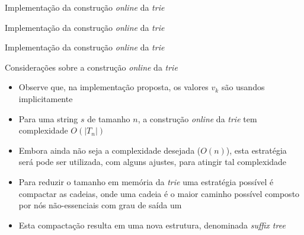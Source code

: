 

\begin{frame}[fragile]{Implementação da construção {\it online} da {\it trie}}
\end{frame}

\begin{frame}[fragile]{Implementação da construção {\it online} da {\it trie}}
\end{frame}

\begin{frame}[fragile]{Implementação da construção {\it online} da {\it trie}}
\end{frame}

\begin{frame}[fragile]{Considerações sobre a construção {\it online} da {\it trie}}

    \begin{itemize}
        \item Observe que, na implementação proposta, os valores $v_k$ são usandos implicitamente
        \pause

        \item Para uma string $s$ de tamanho $n$, a construção \textit{online} da \textit{trie}
            tem complexidade $O(|T_n|)$
        \pause

        \item Embora ainda não seja a complexidade desejada ($O(n)$), esta estratégia será 
            pode ser utilizada, com alguns ajustes, para atingir tal complexidade
        \pause

        \item Para reduzir o tamanho em memória da \textit{trie} uma estratégia possível é 
            compactar as cadeias, onde uma cadeia é o maior caminho possível composto por nós 
            não-essenciais com grau de saída um 
        \pause

        \item Esta compactação resulta em uma nova estrutura, denominada \textit{suffix tree}
    \end{itemize}

\end{frame}
